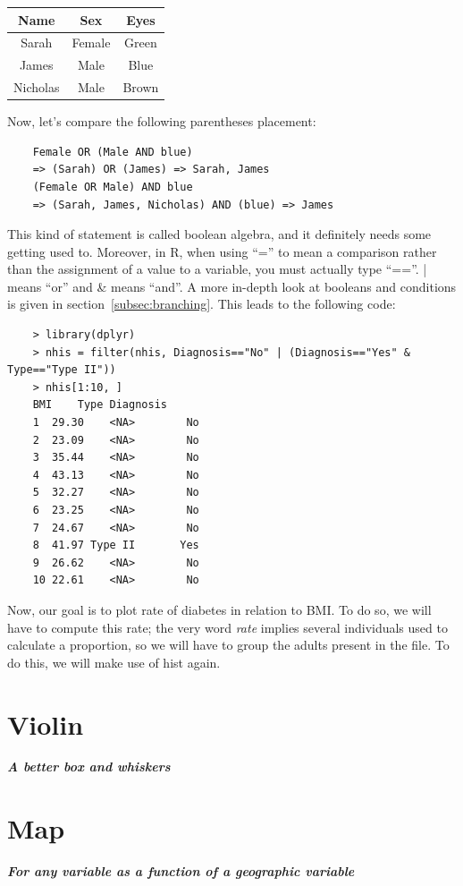 \documentclass{report}
\newcommand{\code}[1]{\textsf{\ttfamily #1}}
\newcommand{\notefor}[1]{\hfill\textbf{\textit{#1}}}
\begin{document}
	\begin{tabular}{|c|c|c|}
		\hline
		Name & Sex & Eyes \\
		\hline
		Sarah & Female & Green \\
		James & Male & Blue \\
		Nicholas & Male & Brown \\
		\hline
	\end{tabular}
	
	Now, let's compare the following parentheses placement:
	\begin{verbatim}
	Female OR (Male AND blue)
	=> (Sarah) OR (James) => Sarah, James
	(Female OR Male) AND blue
	=> (Sarah, James, Nicholas) AND (blue) => James
	\end{verbatim}
	
	This kind of statement is called boolean algebra, and it definitely needs some getting used to. Moreover, in R, when using ``='' to mean a comparison rather than the assignment of a value to a variable, you must actually type ``==''. \code{|} means ``or'' and \code{\&} means ``and''. A more in-depth look at booleans and conditions is given in section~\ref{subsec:branching}. This leads to the following code:
	
	\begin{verbatim}
	> library(dplyr)
	> nhis = filter(nhis, Diagnosis=="No" | (Diagnosis=="Yes" & Type=="Type II"))
	> nhis[1:10, ]
	BMI    Type Diagnosis
	1  29.30    <NA>        No
	2  23.09    <NA>        No
	3  35.44    <NA>        No
	4  43.13    <NA>        No
	5  32.27    <NA>        No
	6  23.25    <NA>        No
	7  24.67    <NA>        No
	8  41.97 Type II       Yes
	9  26.62    <NA>        No
	10 22.61    <NA>        No
	\end{verbatim}
	
	Now, our goal is to plot rate of diabetes in relation to BMI. To do so, we will have to compute this rate; the very word \emph{rate} implies several individuals used to calculate a proportion, so we will have to group the adults present in the file. To do this, we will make use of \code{hist} again.
	
	\section{Violin}
	\notefor{A better box and whiskers}
	
	\section{Map}\label{sec:map}
	\notefor{For any variable as a function of a geographic variable}
	
\end{document}
